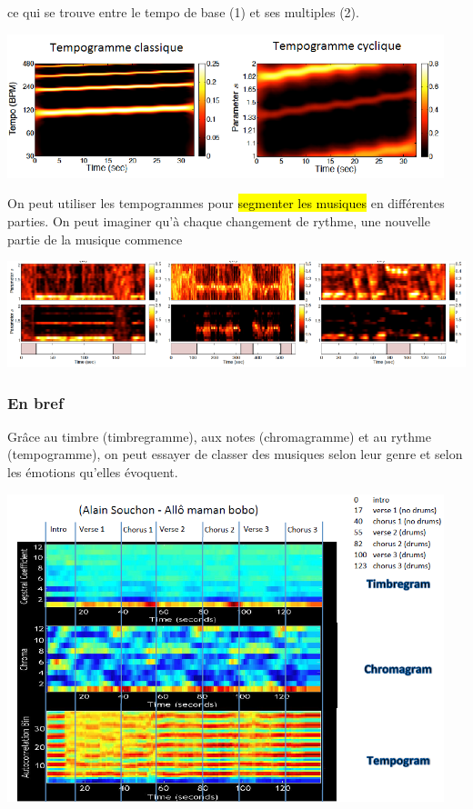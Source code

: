 \documentclass[letterpaper, 12pt]{article}
\newcommand{\alinea}{
\hspace*{0.5cm}}
\begin{document}
					ce qui se trouve entre le tempo de base (1) et ses multiples (2).
				\begin{center}
					\includegraphics[width=5in]{Images/tempograms}
				\end{center}
				\alinea On peut utiliser les tempogrammes pour \hl{segmenter les musiques} en différentes parties. On peut imaginer 
					qu'à chaque changement de rythme, une nouvelle partie de la musique commence
				\begin{center}
					\includegraphics[width=\textwidth]{Images/segmentation}
				\end{center}
			\subsubsection{En bref}
				\alinea Grâce au timbre (timbregramme), aux notes (chromagramme) et au rythme (tempogramme), on peut essayer de classer
					des musiques selon leur genre et selon les émotions qu'elles évoquent.
				\begin{center}
					\includegraphics[width=5in]{Images/local_summary}
				\end{center}
\end{document}
